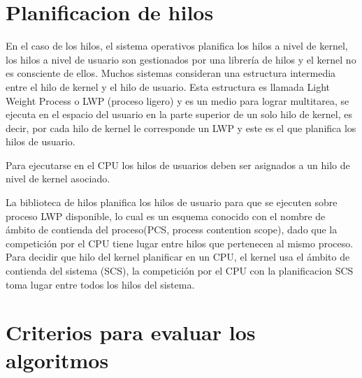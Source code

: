 \documentclass{article}
\begin{document}
\vspace{0.3cm}


{\centering \section*{Planificacion de hilos}}
En el caso de los hilos, el sistema operativos planifica los hilos a nivel de kernel, los
hilos a nivel de usuario son gestionados por una librería de hilos y el kernel no es consciente
de ellos. Muchos sistemas consideran una estructura intermedia entre el hilo de kernel y el hilo
de usuario. Esta estructura es llamada Light Weight Process o LWP (proceso ligero) y es un medio para
lograr multitarea, se ejecuta en el espacio del usuario en la parte superior de un solo hilo de kernel,
es decir, por cada hilo de kernel le corresponde un LWP y este es el que planifica los hilos de usuario.

Para ejecutarse en el CPU los hilos de usuarios deben ser asignados a un hilo de nivel
de kernel asociado.

La biblioteca de hilos planifica los hilos de usuario para que se ejecuten sobre proceso LWP disponible,
lo cual es un esquema conocido con el nombre de ámbito de contienda del proceso(PCS, process contention scope),
dado que la competición por el CPU tiene lugar entre hilos que pertenecen al mismo proceso.
Para decidir que hilo del kernel planificar en un CPU, el kernel usa el ámbito de contienda del sistema (SCS),
la competición por el CPU con la planificacion SCS toma lugar entre todos los hilos del sistema.

\newpage


{\centering \section*{Criterios para evaluar los algoritmos}}
\end{document}
